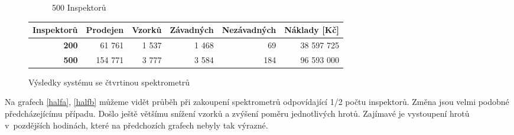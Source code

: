 \documentclass[11pt,a4paper]{article}
\begin{document}
\begin{figure}[h!]
\begin{subfigure}[t]{0.5\textwidth}
    \caption{500 Inspektorů}
    \label{quartb}
  \end{subfigure}
  \begin{tabular}{|r|r|r|r|r|r|}  \hline
        \textbf{Inspektorů}&\textbf{Prodejen} & \textbf{Vzorků} & \textbf{Závadných}   
        & \textbf{Nezávadných} & \textbf{Náklady [Kč]} \\\hline
        \textbf{200}&61 761&1 537&1 468&69&38 597 725         \\\hline
        \textbf{500}&154 771&3 777&3 584&184&96 593 000         \\\hline
      \end{tabular}
  \caption{Výsledky systému se čtvrtinou spektrometrů}
\end{figure} 

Na grafech \ref{halfa}, \ref{halfb} můžeme vidět průběh při zakoupení spektrometrů
odpovídající 1/2 počtu inspektorů. Změna jsou velmi podobné předcházejícímu případu.
Došlo ještě většímu snížení vzorků a zvýšení poměru jednotlivých hrotů.
Zajímavé je vystoupení hrotů v~pozdějších hodinách, které na předchozích grafech nebyly
tak výrazné.
\end{document}
